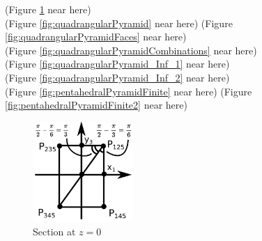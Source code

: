 \documentclass[suppldata, dvipdfmx]{interact}
\theoremstyle{plain}%
\theoremstyle{definition}
\theoremstyle{remark}
\theoremstyle{problemstyle}
\begin{document}
\noindent(Figure \ref{fig:quadrangularPyramidAtOrigin} near here)\\
(Figure \ref{fig:quadrangularPyramid} near here)
(Figure \ref{fig:quadrangularPyramidFaces} near here)\\
(Figure \ref{fig:quadrangularPyramidCombinations}
 near here)\\
(Figure \ref{fig:quadrangularPyramid_Inf_1}
 near here)\\
(Figure \ref{fig:quadrangularPyramid_Inf_2}
 near here)\\
(Figure \ref{fig:pentahedralPyramidFinite}
 near here)
(Figure \ref{fig:pentahedralPyramidFinite2}
 near here)

\begin{figure}[h!tbp]
   \centering
   \includegraphics[width=1.5in, keepaspectratio]{./img/HexahedraWithSphericalFaces/pentahedralPyramid/proofQuadrangularPyramid.jpg}
   \caption{Section at $z=0$}
   \label{fig:quadrangularPyramidAtOrigin}
 \hspace*{\fill}
\end{figure}
\end{document}

